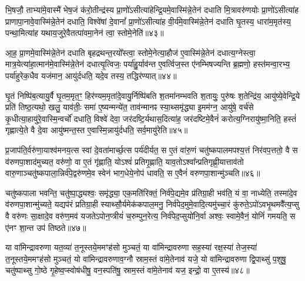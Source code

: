 भि॒षजौ॒ ताभ्या॑मे॒वास्मै॑ भेष॒जं क॑रो॒तीन्द्र॑स्य प्रा॒णो॑\-ऽसीत्या॑हेन्द्रि॒यमे॒वास्मि॑न्ने॒तेन॑ दधाति मि॒त्रावरु॑णयोः प्रा॒णो॑\-ऽसीत्या॑ह प्राणापा॒नावे॒वास्मि॑न्ने॒तेन॑ दधाति॒ विश्वे॑षां दे॒वानां᳚ प्रा॒णो॑\-ऽसीत्या॑ह वी॒र्य॑मे॒वास्मि॑न्ने॒तेन॑ दधाति घृ॒तस्य॒ धारा॑म॒मृत॑स्य॒ पन्था॒मित्या॑ह यथाय॒जुरे॒वैतत्पा॑वमा॒नेन॑ त्वा॒ स्तोमे॒नेति॑॥४३॥

आ॒ह॒ प्रा॒णमे॒वास्मि॑न्ने॒तेन॑ दधाति बृहद्रथन्त॒रयो᳚स्त्वा॒ स्तोमे॒नेत्या॒हौज॑ ए॒वास्मि॑न्ने॒तेन॑ दधात्य॒ग्नेस्त्वा॒ मात्र॒येत्या॑हा॒त्मान॑मे॒वास्मि॑न्ने॒तेन॑ दधात्यृ॒त्विजः॒ पर्या॑हु॒र्याव॑न्त ए॒वर्त्विज॒स्त ए॑नम्भिषज्यन्ति ब्र॒ह्मणो॒ हस्त॑मन्वा॒रभ्य॒ पर्या॑हुरेक॒धैव यज॑मान॒ आयु॑र्दधति॒ यदे॒व तस्य॒ तद्धिर॑ण्यात्॥४४॥

घृ॒तं निष्पि॑ब॒त्यायु॒र्वै घृ॒तम॒मृत॒ꣳ॒ हिर॑ण्यम॒मृता॑दे॒वायु॒र्निष्पि॑बति श॒तमा॑नम्भवति श॒तायुः॒ पुरु॑षः श॒तेन्द्रि॑य॒ आयु॑ष्ये॒वेन्द्रि॒ये प्रति॑ तिष्ठ॒त्यथो॒ खलु॒ याव॑तीः॒ समा॑ ए॒ष्यन्मन्ये॑त॒ ताव॑न्मानꣴ स्या॒थ्समृ॑द्ध्या इ॒मम॑ग्न॒ आयु॑षे॒ वर्च॑से कृ॒धीत्या॒हायु॑रे॒वास्मि॒न्वर्चो॑ दधाति॒ विश्वे॑ देवा॒ जर॑दष्टि॒र्यथास॒दित्या॑ह॒ जर॑दष्टिमे॒वैनं॑ करोत्य॒ग्निरायु॑ष्मा॒निति॒ हस्तं॑ गृह्णात्ये॒ते वै दे॒वा आयु॑ष्मन्त॒स्त ए॒वास्मि॒न्नायु॑र्दधति॒ सर्व॒मायु॑रेति॥४५॥

{\anuvakamend[{रसं॑ दे॒वाना॒ꣴ॒ स्तोमे॒नेति॒ हिर॑ण्या॒दस॒दिति॒ द्वाविꣳ॑शतिश्च॥11॥}]}

प्र॒जाप॑ति॒र्वरु॑णा॒याश्व॑मनय॒त्स स्वां दे॒वता॑मार्च्छ॒त्स पर्य॑दीर्यत॒ स ए॒तं वा॑रु॒णं चतु॑ष्कपालमपश्य॒त्तं निर॑वप॒त्ततो॒ वै स व॑रुणपा॒शाद॑मुच्यत॒ वरु॑णो॒ वा ए॒तं गृ॑ह्णाति॒ यो\-ऽश्वं॑ प्रतिगृ॒ह्णाति॒ याव॒तो\-ऽश्वा᳚न्प्रतिगृह्णी॒यात्ताव॑तो वारु॒णाञ्चतु॑ष्कपाला॒न्निर्व॑पे॒द्वरु॑णमे॒व स्वेन॑ भाग॒धेये॒नोप॑ धावति॒ स ए॒वैनं॑ वरुणपा॒शान्मु॑ञ्चति॥४६॥

चतु॑ष्कपाला भवन्ति॒ चतु॑ष्पा॒द्ध्यश्वः॒ समृ॑द्ध्या॒ एक॒मति॑रिक्तं॒ निर्व॑पे॒द्यमे॒व प्र॑तिग्रा॒ही भव॑ति॒ यं वा॒ नाध्येति॒ तस्मा॑दे॒व व॑रुणपा॒शान्मु॑च्यते॒ यद्यप॑रं प्रतिग्रा॒ही स्याथ्सौ॒र्यमेक॑कपाल॒मनु॒ निर्व॑पेद॒मुमे॒वादि॒त्यमु॑च्चा॒रं कु॑रुते॒\-ऽपो॑\-ऽवभृ॒थमवै᳚त्य॒प्सु वै वरु॑णः सा॒क्षादे॒व वरु॑ण॒मव॑ यजते\-ऽपोन॒प्त्रीयं॑ च॒रुम्पुन॒रेत्य॒ निर्व॑पेद॒प्सुयो॑नि॒र्वा अश्वः॒ स्वामे॒वैनं॒ योनिं॑ गमयति॒ स ए॑नꣳ शा॒न्त उप॑ तिष्ठते॥४७॥

{\anuvakamend[{मु॒ञ्च॒ति॒ च॒रुꣳ स॒प्तद॑श च॥12॥}]}

या वा॑मिन्द्रावरुणा यत॒व्या॑ त॒नूस्तये॒ममꣳह॑सो मुञ्चतं॒ या वा॑मिन्द्रावरुणा सह॒स्या॑ रक्ष॒स्या॑ तेज॒स्या॑ त॒नूस्तये॒ममꣳह॑सो मुञ्चतं॒ यो वा॑मिन्द्रावरुणाव॒ग्नौ स्राम॒स्तं वा॑मे॒तेनाव॑ यजे॒ यो वा॑मिन्द्रावरुणा द्वि॒पाथ्सु॑ प॒शुषु॒ चतु॑ष्पाथ्सु गो॒ष्ठे गृ॒हेष्व॒प्स्वोष॑धीषु॒ वन॒स्पति॑षु॒ स्राम॒स्तं वा॑मे॒तेनाव॑ यज॒ इन्द्रो॒ वा ए॒तस्य॑॥४८॥

